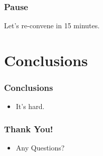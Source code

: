 \documentclass[12pt,xcolor=dvipsnames]{beamer}
\begin{document}
\begin{frame}
  \frametitle{Pause}
  Let's re-convene in 15 minutes.
\end{frame}



\section{Conclusions}

\begin{frame}
  \frametitle{Conclusions}
  \begin{itemize}
  \item It's hard.
  \end{itemize}
\end{frame}

\begin{frame}
  \frametitle{Thank You!}
  \begin{itemize}
  \item Any Questions?
  \end{itemize}
\end{frame}


\end{document}
